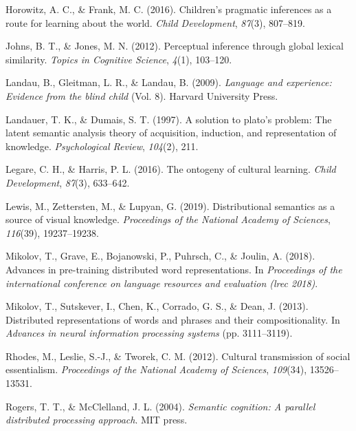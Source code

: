 \documentclass[10pt, letterpaper]{article}
\newlength{\cslhangindent}
\newenvironment{cslreferences}%
  {\setlength{\parindent}{0pt}%
  \everypar{\setlength{\hangindent}{\cslhangindent}}\ignorespaces}%
  {\par}
\begin{document}
\begin{cslreferences}
\leavevmode\hypertarget{ref-horowitz2016}{}%
Horowitz, A. C., \& Frank, M. C. (2016). Children's pragmatic inferences
as a route for learning about the world. \emph{Child Development},
\emph{87}(3), 807--819.

\leavevmode\hypertarget{ref-johns2012}{}%
Johns, B. T., \& Jones, M. N. (2012). Perceptual inference through
global lexical similarity. \emph{Topics in Cognitive Science},
\emph{4}(1), 103--120.

\leavevmode\hypertarget{ref-landau2009}{}%
Landau, B., Gleitman, L. R., \& Landau, B. (2009). \emph{Language and
experience: Evidence from the blind child} (Vol. 8). Harvard University
Press.

\leavevmode\hypertarget{ref-landauer1997}{}%
Landauer, T. K., \& Dumais, S. T. (1997). A solution to plato's problem:
The latent semantic analysis theory of acquisition, induction, and
representation of knowledge. \emph{Psychological Review}, \emph{104}(2),
211.

\leavevmode\hypertarget{ref-legare2016}{}%
Legare, C. H., \& Harris, P. L. (2016). The ontogeny of cultural
learning. \emph{Child Development}, \emph{87}(3), 633--642.

\leavevmode\hypertarget{ref-lewis2019}{}%
Lewis, M., Zettersten, M., \& Lupyan, G. (2019). Distributional
semantics as a source of visual knowledge. \emph{Proceedings of the
National Academy of Sciences}, \emph{116}(39), 19237--19238.

\leavevmode\hypertarget{ref-mikolov2018}{}%
Mikolov, T., Grave, E., Bojanowski, P., Puhrsch, C., \& Joulin, A.
(2018). Advances in pre-training distributed word representations. In
\emph{Proceedings of the international conference on language resources
and evaluation (lrec 2018)}.

\leavevmode\hypertarget{ref-mikolov2013}{}%
Mikolov, T., Sutskever, I., Chen, K., Corrado, G. S., \& Dean, J.
(2013). Distributed representations of words and phrases and their
compositionality. In \emph{Advances in neural information processing
systems} (pp. 3111--3119).

\leavevmode\hypertarget{ref-rhodes2012}{}%
Rhodes, M., Leslie, S.-J., \& Tworek, C. M. (2012). Cultural
transmission of social essentialism. \emph{Proceedings of the National
Academy of Sciences}, \emph{109}(34), 13526--13531.

\leavevmode\hypertarget{ref-rogers2004}{}%
Rogers, T. T., \& McClelland, J. L. (2004). \emph{Semantic cognition: A
parallel distributed processing approach}. MIT press.


\end{cslreferences}
\end{document}
